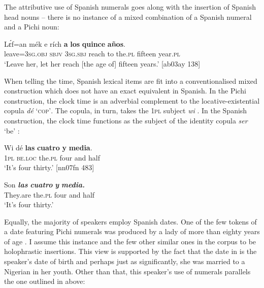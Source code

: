 The attributive use of Spanish numerals goes along with the insertion of Spanish head nouns – there is no instance of a mixed combination of a Spanish numeral and a Pichi noun:


\ea%
    \label{ex:key:1741}
    \gll Lɛ́f=an    mék  e    rích    \textbf{a}  \textbf{los}    \textbf{quince}  \textbf{años}.\\
leave=\textsc{3sg.obj}  \textsc{sbjv}  \textsc{3sg.sbj}  reach  to  the\textsc{.pl}  fifteen  year.\textsc{pl}\\

\glt ‘Leave her, let her reach [the age of] fifteen years.’ [ab03ay 138]
\z

When telling the time, Spanish lexical items are fit into a conventionalised mixed construction which does not have an exact equivalent in Spanish. In the Pichi construction, the clock time is an adverbial complement to the locative-existential copula \textit{dé} ‘\textsc{cop’}. The copula, in turn, takes the \textsc{1pl} subject \textit{wi} . In the Spanish construction, the clock time functions as the subject of the identity copula \textit{ser} ‘be’ :


\ea%
    \label{ex:key:1742}
    \gll Wi  dé    \textbf{las}    \textbf{cuatro}  \textbf{y}  \textbf{media}.\\
\textsc{1pl}  \textsc{be.loc}  the.\textsc{pl}  four    and  half\\

\glt ‘It’s four thirty.’ [nn07fn 483]
\z


\ea%
    \label{ex:key:1743}
    \gll Son      \textbf{\textit{las}}    \textbf{\textit{cuatro}}  \textbf{\textit{y}}  \textbf{\textit{media.}}\\
They.are   the.\textsc{pl}   four    and  half\\

\glt ‘It’s four thirty.’
\z

Equally, the majority of speakers employ Spanish dates. One of the few tokens of a date featuring Pichi numerals was produced by a lady of more than eighty years of age . I assume this instance and the few other similar ones in the corpus to be holophrastic insertions. This view is supported by the fact that the date in  is the speaker’s date of birth and perhaps just as significantly, she was married to a Nigerian in her youth. Other than that, this speaker’s use of numerals parallels the one outlined in  above:


